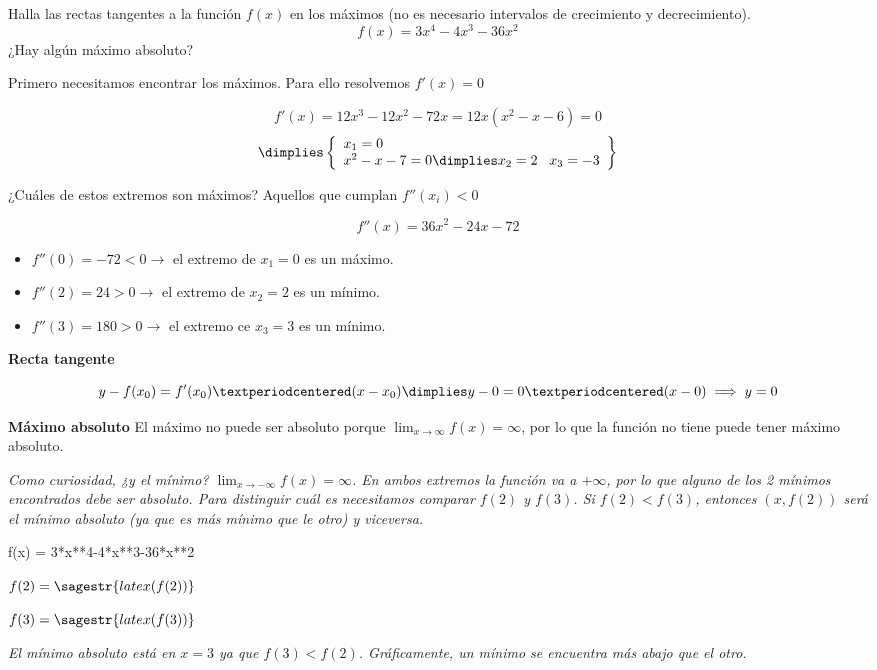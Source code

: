 \documentclass[palatino,nosec]{Docencia}
\begin{document}
\begin{problem} Halla las rectas tangentes a la función $f(x)$ en los máximos (no es necesario intervalos de crecimiento y decrecimiento).
\[
f(x) = 3x^4-4x^3-36x^2
\]
¿Hay algún máximo absoluto?

\solution

Primero necesitamos encontrar los máximos. 
%
Para ello resolvemos $f'(x) = 0$


\[
f'(x) = 12x^3-12x^2-72x = 12x(x^2-x-6) = 0 \]
\[\dimplies \left\{\begin{array}{l}
x_1=0\\
x^2-x-7 = 0 \dimplies x_2 = 2 \;\;\; x_3= -3
\end{array}\right\}
\]

¿Cuáles de estos extremos son máximos? Aquellos que cumplan $f''(x_i) < 0$

\[f''(x) = 36x^2-24x-72\]
\begin{itemize}
	\item $f''(0) = -72 <0 \to $ el extremo de $x_1=0$ es un máximo. 
	\item $f''(2) = 24 > 0 \to $ el extremo de $x_2=2$ es un mínimo. 
	\item $f''(3) = 180 > 0 \to$ el extremo ce $x_3=3$ es un mínimo.
\end{itemize}

\textbf{Recta tangente}

\[
	y-f(x_0) = f'(x_0)·(x-x_0) \dimplies y-0 = 0·(x-0) \implies y=0
\]

\textbf{Máximo absoluto} El máximo no puede ser absoluto porque $\lim_{x\to\infty} f(x) = \infty$, por lo que la función no tiene puede tener máximo absoluto.

\textit{Como curiosidad, ¿y el mínimo? $\lim_{x\to-\infty}f(x) = \infty$. En ambos extremos la función va a $+\infty$, por lo que alguno de los 2 mínimos encontrados debe ser absoluto. 
%
Para distinguir cuál es necesitamos comparar $f(2)$ y $f(3)$. 
%
Si $f(2)<f(3)$, entonces $(x,f(2))$ será el mínimo absoluto (ya que es más mínimo que le otro) y viceversa.}

\begin{sagesilent}
  f(x) = 3*x**4-4*x**3-36*x**2
\end{sagesilent}

$f(2) = \sagestr{latex(f(2))}$

$f(3) = \sagestr{latex(f(3))}$

\textit{El mínimo absoluto está en $x=3$ ya que $f(3)<f(2)$. Gráficamente, un mínimo se encuentra \textit{más abajo} que el otro.   }                                                                                   


\end{problem}
\end{document}
